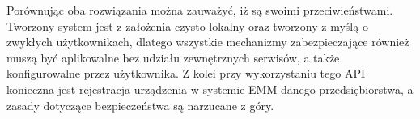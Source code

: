 \newline\newline
\indent Porównując oba rozwiązania można zauważyć, iż są swoimi przeciwieństwami. Tworzony system jest z założenia czysto lokalny oraz tworzony z myślą o zwykłych użytkownikach, dlatego wszystkie mechanizmy zabezpieczające również muszą być aplikowalne bez udziału zewnętrznych serwisów, a także konfigurowalne przez użytkownika. Z kolei przy wykorzystaniu tego API konieczna jest rejestracja urządzenia w systemie EMM danego przedsiębiorstwa, a zasady dotyczące bezpieczeństwa są narzucane z góry.



